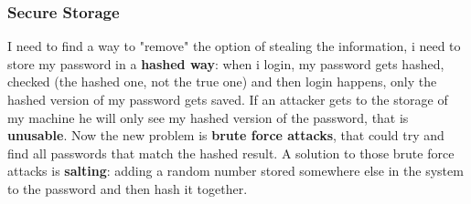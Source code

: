 \subsubsection{Secure Storage}
I need to find a way to "remove" the option of stealing the information, i need
to store my password in a \textbf{hashed way}: when i login, my password gets
hashed, checked (the hashed one, not the true one) and then login happens, only
the hashed version of my password gets saved. If an attacker gets to the 
storage of my machine he will only see my hashed version of the password, that
is \textbf{unusable}.\newline
Now the new problem is \textbf{brute force attacks}, that could try and find 
all passwords that match the hashed result. A solution to those brute force 
attacks is \textbf{salting}: adding a random number stored somewhere else in 
the system to the password and then hash it together.

